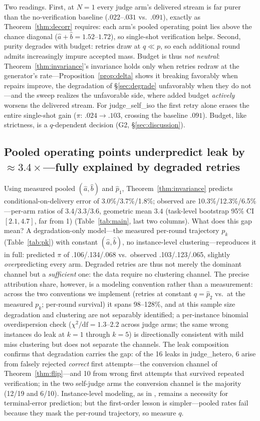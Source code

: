 \documentclass[11pt]{article}
\begin{document}
Two readings.  First, at $N=1$ every judge arm's delivered stream is
far purer than the no-verification baseline ($.022$--$.031$ vs.\
$.091$), exactly as Theorem~\ref{thm:decorr} requires: each arm's
pooled operating point lies above the chance diagonal ($\hat a +
\hat b = 1.52$--$1.72$), so single-shot verification helps.
Second, purity degrades with budget: retries draw at $q \ll p$, so
each additional round admits increasingly impure accepted mass.
Budget is thus \emph{not neutral}: Theorem~\ref{thm:invariance}'s
invariance holds only when retries redraw at the generator's
rate---Proposition~\ref{prop:delta} shows it breaking favorably
when repairs improve, the degradation of §\ref{sec:degrade}
unfavorably when they do not---and the sweep realizes the
unfavorable side, where added budget \emph{actively} worsens the
delivered stream.  For \textsf{judge\_self\_iso} the
first retry alone erases the entire single-shot gain ($\pi$:
$.024 \to .103$, crossing the baseline $.091$).  Budget, like
strictness, is a $q$-dependent decision (G2, §\ref{sec:discussion}).

\subsection{Pooled operating points underpredict leak by
$\approx3.4\times$---fully explained by degraded retries}
Using measured pooled $(\hat a,\hat b)$ and $\hat p_1$,
Theorem~\ref{thm:invariance} predicts conditional-on-delivery error
of 3.0\%/3.7\%/1.8\%; observed are 10.3\%/12.3\%/6.5\%---per-arm
ratios of 3.4/3.3/3.6, geometric mean $3.4$ (task-level bootstrap
95\% CI $[2.1, 4.7]$, far from 1) (Table~\ref{tab:main}, last two
columns).  What does this gap mean?  A degradation-only model---the
measured per-round trajectory $p_k$ (Table~\ref{tab:pk}) with
constant $(\hat a, \hat b)$, no instance-level clustering---reproduces
it in full: predicted $\pi$ of .106/.134/.068 vs.\ observed
.103/.123/.065, slightly \emph{over}predicting every arm.  Degraded
retries are thus not merely the dominant channel but a
\emph{sufficient} one: the data require no clustering channel.  The
precise attribution share, however, is a modeling convention rather
than a measurement: across the two conventions we implement
(retries at constant $q = \hat p_2$ vs.\ at the measured $p_k$;
per-round survival) it spans 98--128\%, and at this sample size
degradation and clustering are not separably identified; a
per-instance binomial overdispersion check
($\chi^2/\mathrm{df} = 1.3$--$2.2$ across judge arms; the same wrong
instances do leak at $k{=}1$ through $k{=}5$) is directionally
consistent with mild miss clustering but does not separate the
channels.  The leak composition confirms that degradation carries
the gap: of the 16 leaks in \textsf{judge\_hetero}, 6 arise from
falsely rejected \emph{correct} first attempts---the conversion
channel of Theorem~\ref{thm:flip}---and 10 from wrong first attempts
that survived repeated verification; in the two self-judge arms the
conversion channel is the majority (12/19 and 6/10).
Instance-level modeling, as in \citet{dorner2026rocnreroll}, remains
a necessity for terminal-error prediction; but the first-order
lesson is simpler---pooled rates fail because they mask the
per-round trajectory, so measure $q$.
\end{document}

